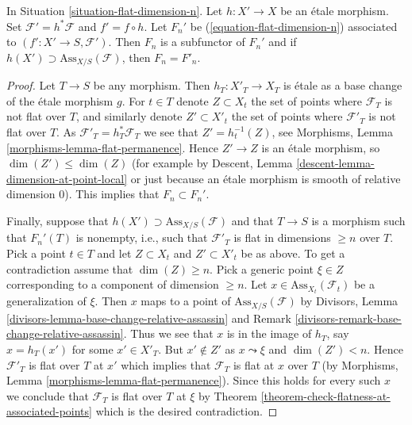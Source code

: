 \begin{lemma}
\label{lemma-localize-flat-dimension-n}
In Situation \ref{situation-flat-dimension-n}.
Let $h : X' \to X$ be an \'etale morphism.
Set $\mathcal{F}' = h^*\mathcal{F}$ and $f' = f \circ h$.
Let $F_n'$ be (\ref{equation-flat-dimension-n})
associated to $(f' : X' \to S, \mathcal{F}')$.
Then $F_n$ is a subfunctor of $F_n'$ and if
$h(X') \supset \text{Ass}_{X/S}(\mathcal{F})$, then $F_n = F'_n$.
\end{lemma}

\begin{proof}
Let $T \to S$ be any morphism. Then $h_T : X'_T \to X_T$ is \'etale as a
base change of the \'etale morphism $g$. For $t \in T$ denote
$Z \subset X_t$ the set of points where $\mathcal{F}_T$ is not
flat over $T$, and similarly denote $Z' \subset X'_t$ the set of
points where $\mathcal{F}'_T$ is not flat over $T$. As
$\mathcal{F}'_T = h_T^*\mathcal{F}_T$ we see that
$Z' = h_t^{-1}(Z)$, see
Morphisms, Lemma \ref{morphisms-lemma-flat-permanence}.
Hence $Z' \to Z$ is an \'etale morphism, so $\dim(Z') \leq \dim(Z)$
(for example by
Descent, Lemma \ref{descent-lemma-dimension-at-point-local}
or just because an \'etale morphism is smooth of relative dimension $0$).
This implies that $F_n \subset F_n'$.

\medskip\noindent
Finally, suppose that $h(X') \supset \text{Ass}_{X/S}(\mathcal{F})$
and that $T \to S$ is a morphism such that $F_n'(T)$ is nonempty, i.e.,
such that $\mathcal{F}'_T$ is flat in dimensions $\geq n$ over $T$.
Pick a point $t \in T$ and let $Z \subset X_t$ and $Z' \subset X'_t$
be as above. To get a contradiction assume that $\dim(Z) \geq n$.
Pick a generic point $\xi \in Z$ corresponding to a component
of dimension $\geq n$. Let $x \in \text{Ass}_{X_t}(\mathcal{F}_t)$
be a generalization of $\xi$. Then $x$ maps to a point of
$\text{Ass}_{X/S}(\mathcal{F})$ by
Divisors, Lemma \ref{divisors-lemma-base-change-relative-assassin} and
Remark \ref{divisors-remark-base-change-relative-assassin}.
Thus we see that $x$ is in the image of $h_T$, say
$x = h_T(x')$ for some $x' \in X'_T$. But $x' \not \in Z'$
as $x \leadsto \xi$ and $\dim(Z') < n$. Hence $\mathcal{F}'_T$
is flat over $T$ at $x'$ which implies that $\mathcal{F}_T$ is flat
at $x$ over $T$ (by
Morphisms, Lemma \ref{morphisms-lemma-flat-permanence}).
Since this holds for every such $x$ we conclude
that $\mathcal{F}_T$ is flat over $T$ at $\xi$ by
Theorem \ref{theorem-check-flatness-at-associated-points}
which is the desired contradiction.
\end{proof}

